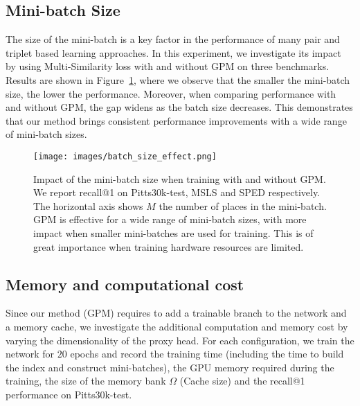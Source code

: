 \documentclass{bmvc2k}
\begin{document}
\subsection{Mini-batch Size}  The size of the mini-batch is a key factor in the performance of many pair and triplet based learning approaches. In this experiment, we investigate its impact by using Multi-Similarity loss with and without GPM on three benchmarks. Results are shown in Figure~\ref{fig:batch_size}, where we observe that the smaller the mini-batch size, the lower the performance.
Moreover, when comparing performance with and without GPM, the gap widens as the batch size decreases. This demonstrates that our method brings consistent performance improvements with a wide range of mini-batch sizes. \begin{figure}[h]
  \centering
  \texttt{[image: images/batch\_size\_effect.png]}
  \vspace{4pt}
  \caption{\small Impact of the mini-batch size when training with and without GPM. We report recall@1 on Pitts30k-test, MSLS and SPED respectively.  The horizontal axis shows $M$ the number of places in the mini-batch. GPM is effective for a wide range of mini-batch sizes, with more impact when smaller mini-batches are used for training. This is of great importance when training hardware resources are limited.}
\label{fig:batch_size}
\end{figure}

\subsection{Memory and computational cost}
Since our method (GPM) requires to add a trainable branch to the network and a memory cache, we investigate the additional computation and memory cost by varying the dimensionality of the proxy head. For each configuration, we train the network for $20$ epochs and record the training time (including the time to build the index and construct mini-batches), the GPU memory required during the training, the size of the memory bank $\Omega$ (Cache size) and the recall@1 performance on Pitts30k-test. 
\end{document}

